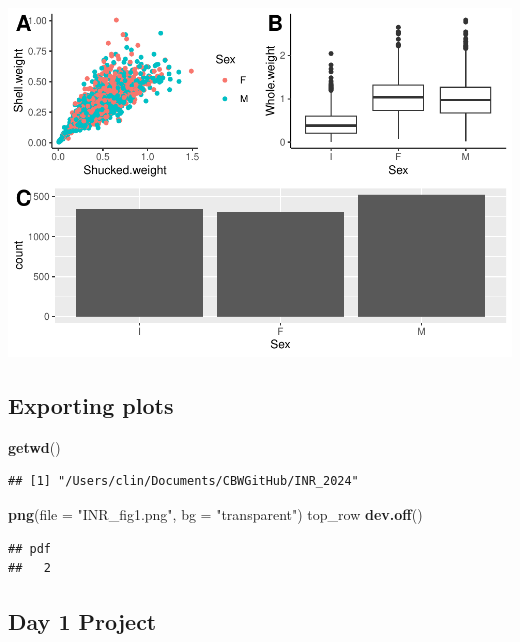 \documentclass[
]{book}
\newenvironment{Shaded}{\begin{snugshade}}{\end{snugshade}}
\newcommand{\AttributeTok}[1]{\textcolor[rgb]{0.13,0.29,0.53}{#1}}
\newcommand{\FunctionTok}[1]{\textcolor[rgb]{0.13,0.29,0.53}{\textbf{#1}}}
\newcommand{\NormalTok}[1]{#1}
\newcommand{\StringTok}[1]{\textcolor[rgb]{0.31,0.60,0.02}{#1}}
\begin{document}
\includegraphics{_main_files/figure-latex/unnamed-chunk-55-1.pdf}

\subsection{Exporting plots}\label{exporting-plots}

\begin{Shaded}
\begin{Highlighting}[]
\FunctionTok{getwd}\NormalTok{()}
\end{Highlighting}
\end{Shaded}

\begin{verbatim}
## [1] "/Users/clin/Documents/CBWGitHub/INR_2024"
\end{verbatim}

\begin{Shaded}
\begin{Highlighting}[]
\FunctionTok{png}\NormalTok{(}\AttributeTok{file =} \StringTok{"INR\_fig1.png"}\NormalTok{, }\AttributeTok{bg =} \StringTok{"transparent"}\NormalTok{)}
\NormalTok{top\_row}
\FunctionTok{dev.off}\NormalTok{()}
\end{Highlighting}
\end{Shaded}

\begin{verbatim}
## pdf 
##   2
\end{verbatim}

\subsection{Day 1 Project}\label{day-1-project}
\end{document}
